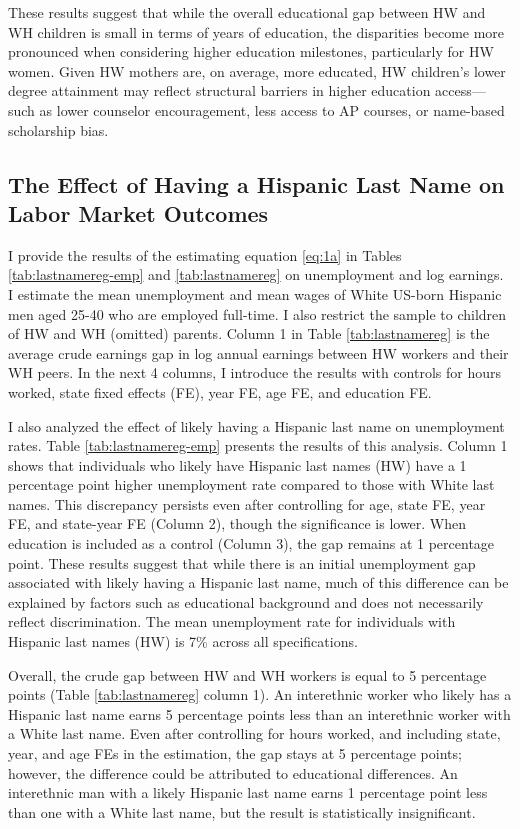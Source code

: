 These results suggest that while the overall educational gap between HW and WH children is small in terms of years of education, the disparities become more pronounced when considering higher education milestones, particularly for HW women. Given HW mothers are, on average, more educated, HW children's lower degree attainment may reflect structural barriers in higher education access---such as lower counselor encouragement, less access to AP courses, or name-based scholarship bias.

\subsection{The Effect of Having a Hispanic Last Name on Labor Market Outcomes}

I provide the results of the estimating equation \ref{eq:1a} in Tables \ref{tab:lastnamereg-emp} and \ref{tab:lastnamereg} on unemployment and log earnings. I estimate the mean unemployment and mean wages of White US-born Hispanic men aged 25-40 who are employed full-time. I also restrict the sample to children of HW and WH (omitted) parents.  Column 1 in Table \ref{tab:lastnamereg} is the average crude earnings gap in log annual earnings between HW workers and their WH peers. In the next 4 columns, I introduce the results with controls for hours worked, state fixed effects (FE), year FE, age FE, and education FE.

I also analyzed the effect of likely having a Hispanic last name on unemployment rates. Table \ref{tab:lastnamereg-emp} presents the results of this analysis. Column 1 shows that individuals who likely have Hispanic last names (HW) have a 1 percentage point higher unemployment rate compared to those with White last names. This discrepancy persists even after controlling for age, state FE, year FE, and state-year FE (Column 2), though the significance is lower. When education is included as a control (Column 3), the gap remains at 1 percentage point. These results suggest that while there is an initial unemployment gap associated with likely having a Hispanic last name, much of this difference can be explained by factors such as educational background and does not necessarily reflect discrimination. The mean unemployment rate for individuals with Hispanic last names (HW) is 7\% across all specifications.

Overall, the crude gap between HW and WH workers is equal to 5 percentage points (Table \ref{tab:lastnamereg} column 1). An interethnic worker who likely has a Hispanic last name earns 5 percentage points less than an interethnic worker with a White last name. Even after controlling for hours worked, and including state, year, and age FEs in the estimation, the gap stays at 5 percentage points; however, the difference could be attributed to educational differences. An interethnic man with a likely Hispanic last name earns 1 percentage point less than one with a White last name, but the result is statistically insignificant.


